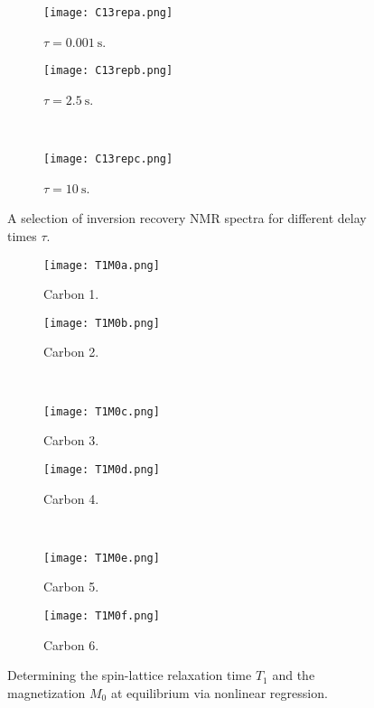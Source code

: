 \documentclass[../labs.tex]{subfiles}
\begin{document}
\begin{figure}[H]
    \centering
    \begin{subfigure}[b]{0.49\linewidth}
        \centering
        \texttt{[image: C13repa.png]}
        \caption{$\tau=\SI{0.001}{\second}$.}
        \label{fig:C13repa}
    \end{subfigure}
    \begin{subfigure}[b]{0.49\linewidth}
        \centering
        \texttt{[image: C13repb.png]}
        \caption{$\tau=\SI{2.5}{\second}$.}
        \label{fig:C13repb}
    \end{subfigure}\\[1em]
    \begin{subfigure}[b]{0.49\linewidth}
        \centering
        \texttt{[image: C13repc.png]}
        \caption{$\tau=\SI{10}{\second}$.}
        \label{fig:C13repc}
    \end{subfigure}
    \caption{A selection of inversion recovery  NMR spectra for different delay times $\tau$.}
    \label{fig:C13rep}
\end{figure}

\begin{figure}[H]
    \centering
    \begin{subfigure}[b]{0.49\linewidth}
        \centering
        \texttt{[image: T1M0a.png]}
        \caption{Carbon 1.}
        \label{fig:T1M0a}
    \end{subfigure}
    \begin{subfigure}[b]{0.49\linewidth}
        \centering
        \texttt{[image: T1M0b.png]}
        \caption{Carbon 2.}
        \label{fig:T1M0b}
    \end{subfigure}\\[1em]
    \begin{subfigure}[b]{0.49\linewidth}
        \centering
        \texttt{[image: T1M0c.png]}
        \caption{Carbon 3.}
        \label{fig:T1M0c}
    \end{subfigure}
    \begin{subfigure}[b]{0.49\linewidth}
        \centering
        \texttt{[image: T1M0d.png]}
        \caption{Carbon 4.}
        \label{fig:T1M0d}
    \end{subfigure}\\[1em]
    \begin{subfigure}[b]{0.49\linewidth}
        \centering
        \texttt{[image: T1M0e.png]}
        \caption{Carbon 5.}
        \label{fig:T1M0e}
    \end{subfigure}
    \begin{subfigure}[b]{0.49\linewidth}
        \centering
        \texttt{[image: T1M0f.png]}
        \caption{Carbon 6.}
        \label{fig:T1M0f}
    \end{subfigure}
    \caption{Determining the spin-lattice relaxation time $T_1$ and the magnetization $M_0$ at equilibrium via nonlinear regression.}
    \label{fig:T1M0}
\end{figure}
\end{document}
